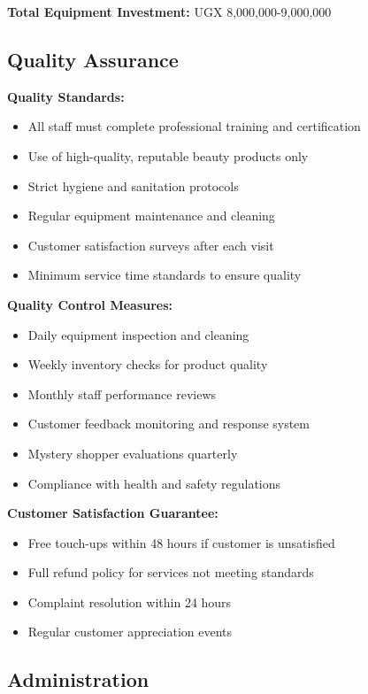 \textbf{Total Equipment Investment:} UGX 8,000,000-9,000,000

\subsection{Quality Assurance}

\textbf{Quality Standards:}
\begin{itemize}[leftmargin=2em]
    \item All staff must complete professional training and certification
    \item Use of high-quality, reputable beauty products only
    \item Strict hygiene and sanitation protocols
    \item Regular equipment maintenance and cleaning
    \item Customer satisfaction surveys after each visit
    \item Minimum service time standards to ensure quality
\end{itemize}

\textbf{Quality Control Measures:}
\begin{itemize}[leftmargin=2em]
    \item Daily equipment inspection and cleaning
    \item Weekly inventory checks for product quality
    \item Monthly staff performance reviews
    \item Customer feedback monitoring and response system
    \item Mystery shopper evaluations quarterly
    \item Compliance with health and safety regulations
\end{itemize}

\textbf{Customer Satisfaction Guarantee:}
\begin{itemize}[leftmargin=2em]
    \item Free touch-ups within 48 hours if customer is unsatisfied
    \item Full refund policy for services not meeting standards
    \item Complaint resolution within 24 hours
    \item Regular customer appreciation events
\end{itemize}

\subsection{Administration}

